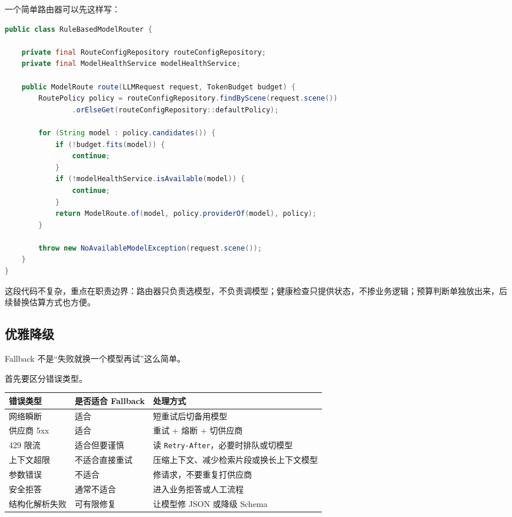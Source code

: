 \documentclass[10pt,a4paper]{ctexart}
\begin{document}
一个简单路由器可以先这样写：



\begin{lstlisting}[language=Java]
public class RuleBasedModelRouter {

    private final RouteConfigRepository routeConfigRepository;
    private final ModelHealthService modelHealthService;

    public ModelRoute route(LLMRequest request, TokenBudget budget) {
        RoutePolicy policy = routeConfigRepository.findByScene(request.scene())
                .orElseGet(routeConfigRepository::defaultPolicy);

        for (String model : policy.candidates()) {
            if (!budget.fits(model)) {
                continue;
            }
            if (!modelHealthService.isAvailable(model)) {
                continue;
            }
            return ModelRoute.of(model, policy.providerOf(model), policy);
        }

        throw new NoAvailableModelException(request.scene());
    }
}
\end{lstlisting}



这段代码不复杂，重点在职责边界：路由器只负责选模型，不负责调模型；健康检查只提供状态，不掺业务逻辑；预算判断单独放出来，后续替换估算方式也方便。



\subsection{优雅降级}


Fallback 不是“失败就换一个模型再试”这么简单。



首先要区分错误类型。


{\footnotesize
\begin{tabularx}{\textwidth}{|X|X|X|}
\hline
\textbf{错误类型} & \textbf{是否适合 Fallback} & \textbf{处理方式} \\
\hline
网络瞬断 & 适合 & 短重试后切备用模型 \\
\hline
供应商 5xx & 适合 & 重试 + 熔断 + 切供应商 \\
\hline
429 限流 & 适合但要谨慎 & 读 \texttt{Retry-After}，必要时排队或切模型 \\
\hline
上下文超限 & 不适合直接重试 & 压缩上下文、减少检索片段或换长上下文模型 \\
\hline
参数错误 & 不适合 & 修请求，不要重复打供应商 \\
\hline
安全拒答 & 通常不适合 & 进入业务拒答或人工流程 \\
\hline
结构化解析失败 & 可有限修复 & 让模型修 JSON 或降级 Schema \\
\hline
\end{tabularx}
}
\end{document}
